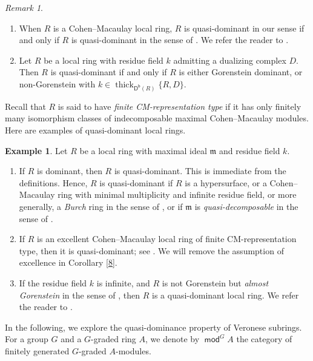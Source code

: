 \documentclass{amsart}
\theoremstyle{definition}
\newtheorem{eg}[thm]{Example}
\theoremstyle{remark}
\newtheorem{rem}[thm]{Remark}
\numberwithin{equation}{thm}
\def\Db{\operatorname{\mathsf{D^b}}}
\def\m{\mathfrak{m}}
\def\mod{\operatorname{\mathsf{mod}}}
\def\thick{\operatorname{thick}}
\begin{document}
\begin{rem}\label{4}
\begin{enumerate}[(1)]
\item
When $R$ is a Cohen--Macaulay local ring, $R$ is quasi-dominant in our sense if and only if $R$ is quasi-dominant in the sense of \cite{T23}.
We refer the reader to \cite[Proposition 10.15(2)]{T23}.
\item
Let $R$ be a local ring with residue field $k$ admitting a dualizing complex $D$.
Then $R$ is quasi-dominant if and only if $R$ is either Gorenstein dominant, or non-Gorenstein with $k\in \thick_{\Db(R)}\{R,D\}$.
\end{enumerate}
\end{rem}

Recall that $R$ is said to have {\em finite CM-representation type} if it has only finitely many isomorphism classes of indecomposable maximal Cohen--Macaulay modules. 
Here are examples of quasi-dominant local rings.

\begin{eg}\label{1}
Let $R$ be a local ring with maximal ideal $\m$ and residue field $k$.
\begin{enumerate}[(1)]
\item
If $R$ is dominant, then $R$ is quasi-dominant.
This is immediate from the definitions.
Hence, $R$ is quasi-dominant if $R$ is a hypersurface, or a Cohen--Macaulay ring with minimal multiplicity and infinite residue field, or more generally, a {\em Burch} ring in the sense of \cite{burch}, or if $\m$ is {\em quasi-decomposable} in the sense of \cite{fiber}.
\item
If $R$ is an excellent Cohen--Macaulay local ring of finite CM-representation type, then it is quasi-dominant; see \cite[Proposition 10.15(4)]{T23}.
We will remove the assumption of excellence in Corollary \ref{8}.
\item
If the residue field $k$ is infinite, and $R$ is not Gorenstein but {\em almost Gorenstein} in the sense of \cite{GTT15}, then $R$ is a quasi-dominant local ring.
We refer the reader to \cite[Proposition 10.15(5)]{T23}.
\end{enumerate}
\end{eg}

In the following, we explore the quasi-dominance property of Veronese subrings.
For a group $G$ and a $G$-graded ring $A$, we denote by $\mod^GA$ the category of finitely generated $G$-graded $A$-modules.
\end{document}
